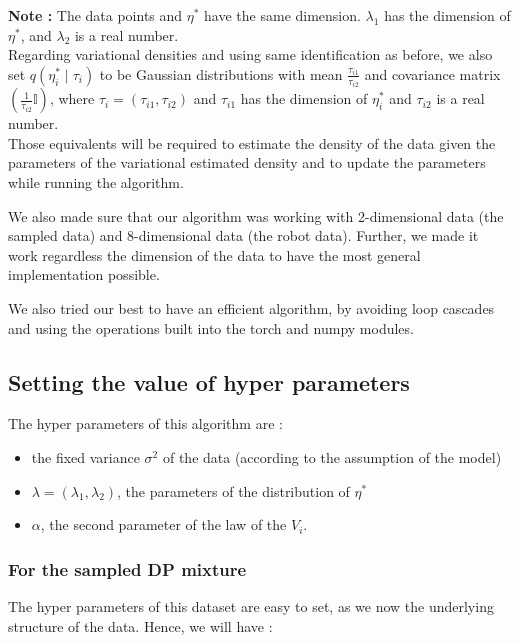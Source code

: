 \documentclass{article}
\begin{document}
\textbf{Note :} The data points and \(\eta^*\) have the same dimension. \(\lambda_1\) has the dimension of \(\eta^*\), and \(\lambda_2\) is a real number.\\

Regarding variational densities and using same identification as before, we also set \(q(\eta_i^* \mid \tau_i)\) to be Gaussian distributions with mean \(\frac{\tau_{i1}}{\tau_{i2}}\) and covariance matrix \(\left(\frac{1}{\tau_{i2}}\mathbb{I}\right)\), where $\tau_i = (\tau_{i1}, \tau_{i2})$ and $\tau_{i1}$ has the dimension of $\eta_i^*$ and $\tau_{i2}$ is a real number.\\

Those equivalents will be required to estimate the density of the data given the parameters of the variational estimated density and to update the parameters while running the algorithm.

We also made sure that our algorithm was working with 2-dimensional data (the sampled data) and 8-dimensional data (the robot data). Further, we made it work regardless the dimension of the data to have the most general implementation possible.

We also tried our best to have an efficient algorithm, by avoiding loop cascades and using the operations built into the torch and numpy modules.

\subsection{Setting the value of hyper parameters}

The hyper parameters of this algorithm are :

\begin{itemize}
    \item the fixed variance $\sigma^2$ of the data (according to the assumption of the model)
    \item $\lambda = (\lambda_1, \lambda_2)$, the parameters of the distribution of $\eta^*$
    \item $\alpha$, the second parameter of the law of the $V_i$.
\end{itemize}

\subsubsection{For the sampled DP mixture}
The hyper parameters of this dataset are easy to set, as we now the underlying structure of the data.
Hence, we will have :
\end{document}
